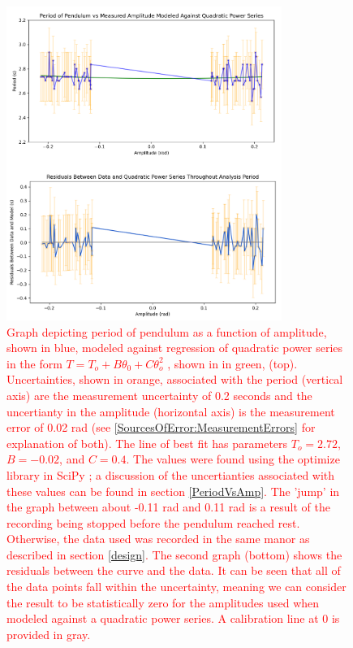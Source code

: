 \documentclass[11pt]{article}
\begin{document}
        \begin{figure}[H]
            \centering\includegraphics[width = 0.8\textwidth]{QuadGraph.PNG}
            \caption{\textcolor{red}{Graph depicting period of pendulum as a function of amplitude, shown in blue, modeled against regression of quadratic power series in the form $T = T_{o} + B\theta_{0} + C\theta_{o}^{2}$ \cite{labManual}, shown in in green, (top). Uncertainties, shown in orange, associated with the period (vertical axis) are the measurement uncertainty of 0.2 seconds and the uncertianty in the amplitude (horizontal axis) is the measurement error of 0.02 rad (see \ref{SourcesOfError:MeasurementErrors} for explanation of both). The line of best fit has parameters $T_o = 2.72$, $B = -0.02 $, and $C = 0.4$. The values were found using the optimize library in SciPy \cite{2020SciPy-NMeth}; a discussion of the uncertianties associated with these values can be found in section \ref{PeriodVsAmp}. The 'jump' in the graph between about -0.11 rad and 0.11 rad is a result of the recording being stopped before the pendulum reached rest. Otherwise, the data used was recorded in the same manor as described in section \ref{design}. The second graph (bottom) shows the residuals between the curve and the data. It can be seen that all of the data points fall within the uncertainty, meaning we can consider the result to be statistically zero for the amplitudes used when modeled against a quadratic power series. A calibration line at 0 is provided in gray.}}    
            \label{fig:QuadraticPowerSeries}        
        \end{figure}
\end{document}
